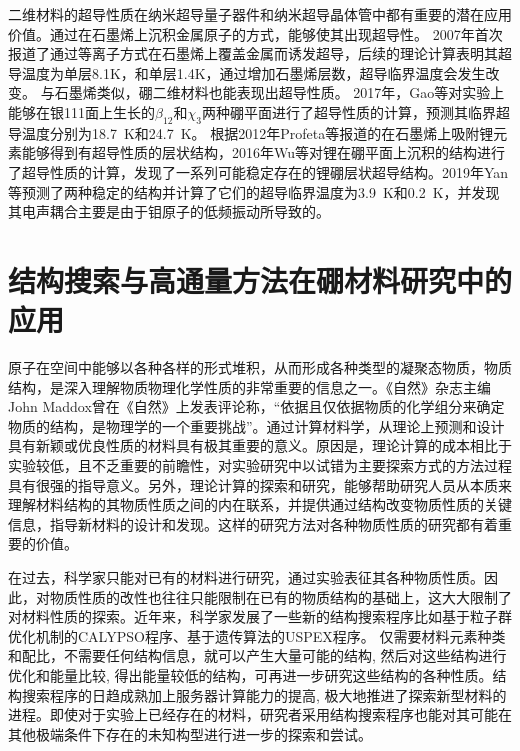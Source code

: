 二维材料的超导性质在纳米超导量子器件\cite{pribiag2015edge}和纳米超导晶体管\cite{el2013superconductivity}中都有重要的潜在应用价值。通过在石墨烯上沉积金属原子的方式，能够使其出现超导性。
2007年首次报道了通过等离子方式在石墨烯上覆盖金属而诱发超导\cite{uchoa2007superconducting}，后续的理论计算表明其超导温度为单层8.1K\cite{gholami2018superconducting}，和单层1.4K\cite{yang2014superconducting}，通过增加石墨烯层数，超导临界温度会发生改变。
与石墨烯类似，硼二维材料也能表现出超导性质。
2017年，Gao等\cite{gao2017prediction}对实验上能够在银111面上生长的$\beta_{12}$和$\chi_3$两种硼平面进行了超导性质的计算，预测其临界超导温度分别为\SI{18.7}{\kelvin}和\SI{24.7}{\kelvin}。
根据2012年Profeta等\cite{profeta2012phonon}报道的在石墨烯上吸附锂元素能够得到有超导性质的层状结构，2016年Wu等\cite{wu2016lithium}对锂在硼平面上沉积的结构进行了超导性质的计算，发现了一系列可能稳定存在的锂硼层状超导结构。2019年Yan等\cite{yan2019prediction}预测了两种稳定的结构并计算了它们的超导临界温度为\SI{3.9}{\kelvin}和\SI{0.2}{\kelvin}，并发现其电声耦合主要是由于钼原子的低频振动所导致的。

\section{结构搜索与高通量方法在硼材料研究中的应用}

原子在空间中能够以各种各样的形式堆积，从而形成各种类型的凝聚态物质，物质结构，是深入理解物质物理化学性质的非常重要的信息之一。《自然》杂志主编John Maddox曾在《自然》上发表评论称，“依据且仅依据物质的化学组分来确定物质的结构，是物理学的一个重要挑战”。通过计算材料学，从理论上预测和设计具有新颖或优良性质的材料具有极其重要的意义。原因是，理论计算的成本相比于实验较低，且不乏重要的前瞻性，对实验研究中以试错为主要探索方式的方法过程具有很强的指导意义。另外，理论计算的探索和研究，能够帮助研究人员从本质来理解材料结构的其物质性质之间的内在联系，并提供通过结构改变物质性质的关键信息，指导新材料的设计和发现。这样的研究方法对各种物质性质的研究都有着重要的价值。

在过去，科学家只能对已有的材料进行研究，通过实验表征其各种物质性质。因此，对物质性质的改性也往往只能限制在已有的物质结构的基础上，这大大限制了对材料性质的探索。近年来，科学家发展了一些新的结构搜索程序比如基于粒子群优化机制的CALYPSO程序\cite{wang2012calypso}、基于遗传算法的USPEX程序\cite{glass2006uspex}。
仅需要材料元素种类和配比，不需要任何结构信息，就可以产生大量可能的结构, 然后对这些结构进行优化和能量比较, 得出能量较低的结构，可再进一步研究这些结构的各种性质。结构搜索程序的日趋成熟加上服务器计算能力的提高, 极大地推进了探索新型材料的进程。即使对于实验上已经存在的材料，研究者采用结构搜索程序也能对其可能在其他极端条件下存在的未知构型进行进一步的探索和尝试。

